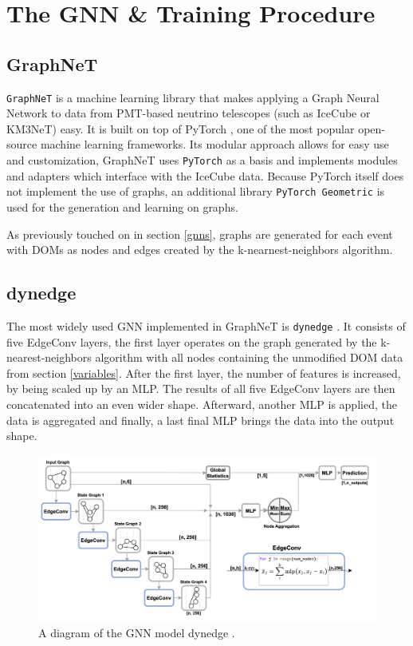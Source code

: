 \documentclass[a4paper,10pt]{scrartcl}
\begin{document}
\section{The GNN \& Training Procedure}

\subsection{GraphNeT}
\label{graphnet}

\texttt{GraphNeT} \cite{graphnet} is a machine learning library that makes applying a Graph Neural Network to data from PMT-based neutrino telescopes (such as IceCube or KM3NeT) easy.
It is built on top of PyTorch \cite{torch}, one of the most popular open-source machine learning frameworks.
Its modular approach allows for easy use and customization, GraphNeT uses \texttt{PyTorch} as a basis and implements modules and adapters which interface with the IceCube data.
Because PyTorch itself does not implement the use of graphs, an additional library \texttt{PyTorch Geometric} \cite{torch-geometric} is used for the generation and learning on graphs.

As previously touched on in section \ref{gnns}, graphs are generated for each event with DOMs as nodes and edges created by the k-nearnest-neighbors algorithm.

\subsection{dynedge}

The most widely used GNN implemented in GraphNeT is \texttt{dynedge} \cite{2209.03042}.
It consists of five EdgeConv layers, the first layer operates on the graph generated by the k-nearest-neighbors algorithm with all nodes containing the unmodified DOM data from section \ref{variables}.
After the first layer, the number of features is increased, by being scaled up by an MLP.
The results of all five EdgeConv layers are then concatenated into an even wider shape.
Afterward, another MLP is applied, the data is aggregated and finally, a last final MLP brings the data into the output shape.

\begin{figure}[h]
    \includegraphics[width=\textwidth]{images/dynedge.png}
    \centering
    \caption{A diagram of the GNN model dynedge \cite{2209.03042}.}
    \label{fig:dynedge}
\end{figure}
\end{document}
